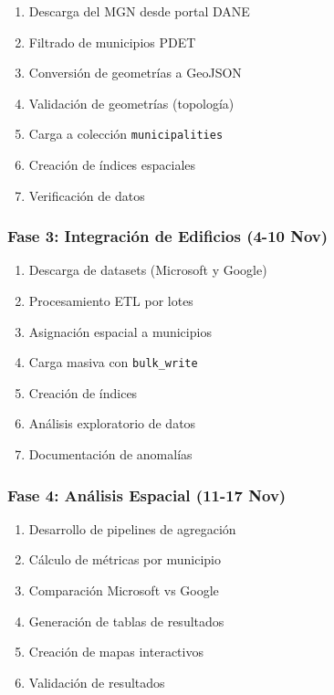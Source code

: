 \documentclass[12pt,a4paper]{article}
\begin{document}
\begin{enumerate}
    \item Descarga del MGN desde portal DANE
    \item Filtrado de municipios PDET
    \item Conversión de geometrías a GeoJSON
    \item Validación de geometrías (topología)
    \item Carga a colección \texttt{municipalities}
    \item Creación de índices espaciales
    \item Verificación de datos
\end{enumerate}

\subsubsection{Fase 3: Integración de Edificios (4-10 Nov)}

\begin{enumerate}
    \item Descarga de datasets (Microsoft y Google)
    \item Procesamiento ETL por lotes
    \item Asignación espacial a municipios
    \item Carga masiva con \texttt{bulk\_write}
    \item Creación de índices
    \item Análisis exploratorio de datos
    \item Documentación de anomalías
\end{enumerate}

\subsubsection{Fase 4: Análisis Espacial (11-17 Nov)}

\begin{enumerate}
    \item Desarrollo de pipelines de agregación
    \item Cálculo de métricas por municipio
    \item Comparación Microsoft vs Google
    \item Generación de tablas de resultados
    \item Creación de mapas interactivos
    \item Validación de resultados
\end{enumerate}
\end{document}

